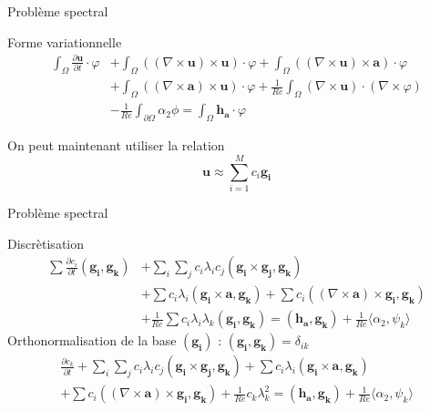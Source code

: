 \documentclass{beamer}
\newcommand{\rot}{{\nabla\times}}
\begin{document}
\begin{frame}{Problème spectral}
\begin{block}{Forme variationnelle}
\begin{align*}
\int_\Omega \frac{\partial \mathbf{u}}{\partial t}\cdot \varphi &+ \int_\Omega ((\rot \mathbf{u})\times \mathbf{u})\cdot \varphi + \int_\Omega ((\rot \mathbf{u})\times \mathbf{a})\cdot\varphi \\
&+ \int_\Omega ((\rot \mathbf{a})\times \mathbf{u})\cdot\varphi + \frac{1}{Re}\int_\Omega (\rot \mathbf{u})\cdot(\rot\varphi) \\
&-\frac{1}{Re}\int_{\partial\Omega} \alpha_2\phi = \int_\Omega \mathbf{h_a}\cdot\varphi
\end{align*}
\end{block}
On peut maintenant utiliser la relation 
\[
\mathbf{u}\approx\sum_{i=1}^M c_i\mathbf{g_i}
\]
\end{frame}

\begin{frame}{Problème spectral}
\begin{block}{Discrètisation}
\begin{align*}
\sum \frac{\partial c_i}{\partial t}(\mathbf{g_i},\mathbf{g_k}) &+ \sum_i\sum_j c_i\lambda_i c_j(\mathbf{g_i}\times \mathbf{g_j}, \mathbf{g_k}) \\
&+ \sum c_i\lambda_i(\mathbf{g_i}\times \mathbf{a},\mathbf{g_k}) + \sum c_i((\rot \mathbf{a})\times \mathbf{g_i}, \mathbf{g_k}) \\
&+ \frac{1}{Re}\sum c_i\lambda_i\lambda_k(\mathbf{g_i},\mathbf{g_k}) = (\mathbf{h_a},\mathbf{g_k}) + \frac{1}{Re}\langle\alpha_2,\psi_k\rangle
\end{align*}
Orthonormalisation de la base $(\mathbf{g_i})$ : $(\mathbf{g_i},\mathbf{g_k})=\delta_{ik}$
\begin{eqnarray*}
\frac{\partial c_k}{\partial t} + \sum_i\sum_j c_i\lambda_i c_j(\mathbf{g_i}\times \mathbf{g_j}, \mathbf{g_k}) + \sum c_i\lambda_i(\mathbf{g_i}\times \mathbf{a},\mathbf{g_k})\\
+ \sum c_i((\rot \mathbf{a})\times \mathbf{g_i}, \mathbf{g_k}) + \frac{1}{Re}c_k\lambda_k^2 = (\mathbf{h_a},\mathbf{g_k}) + \frac{1}{Re}\langle\alpha_2,\psi_k\rangle
\end{eqnarray*}
\end{block}
\end{frame}
\end{document}
